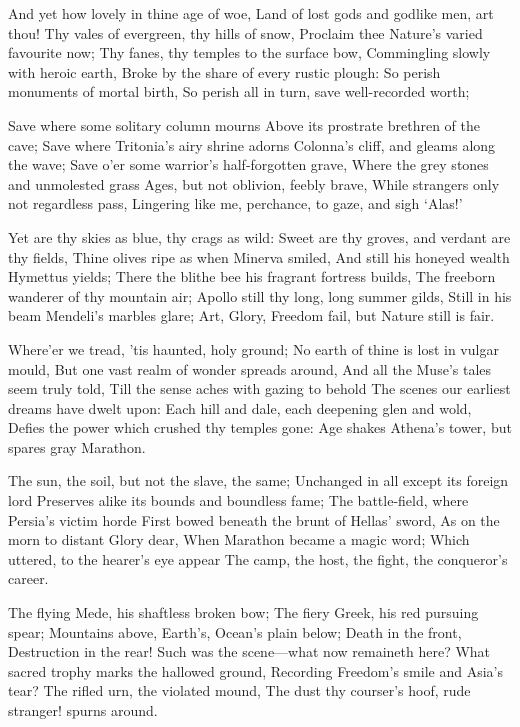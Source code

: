 \documentclass[10pt,twocolumn]{book}
\begin{document}
   And yet how lovely in thine age of woe,
   Land of lost gods and godlike men, art thou!
   Thy vales of evergreen, thy hills of snow,
   Proclaim thee Nature's varied favourite now;
   Thy fanes, thy temples to the surface bow,
   Commingling slowly with heroic earth,
   Broke by the share of every rustic plough:
   So perish monuments of mortal birth,
So perish all in turn, save well-recorded worth;


   Save where some solitary column mourns
   Above its prostrate brethren of the cave;
   Save where Tritonia's airy shrine adorns
   Colonna's cliff, and gleams along the wave;
   Save o'er some warrior's half-forgotten grave,
   Where the grey stones and unmolested grass
   Ages, but not oblivion, feebly brave,
   While strangers only not regardless pass,
Lingering like me, perchance, to gaze, and sigh `Alas!'


   Yet are thy skies as blue, thy crags as wild:
   Sweet are thy groves, and verdant are thy fields,
   Thine olives ripe as when Minerva smiled,
   And still his honeyed wealth Hymettus yields;
   There the blithe bee his fragrant fortress builds,
   The freeborn wanderer of thy mountain air;
   Apollo still thy long, long summer gilds,
   Still in his beam Mendeli's marbles glare;
Art, Glory, Freedom fail, but Nature still is fair.


   Where'er we tread, 'tis haunted, holy ground;
   No earth of thine is lost in vulgar mould,
   But one vast realm of wonder spreads around,
   And all the Muse's tales seem truly told,
   Till the sense aches with gazing to behold
   The scenes our earliest dreams have dwelt upon:
   Each hill and dale, each deepening glen and wold,
   Defies the power which crushed thy temples gone:
Age shakes Athena's tower, but spares gray Marathon.


   The sun, the soil, but not the slave, the same;
   Unchanged in all except its foreign lord\textemdash
   Preserves alike its bounds and boundless fame;
   The battle-field, where Persia's victim horde
   First bowed beneath the brunt of Hellas' sword,
   As on the morn to distant Glory dear,
   When Marathon became a magic word;
   Which uttered, to the hearer's eye appear
The camp, the host, the fight, the conqueror's career.


   The flying Mede, his shaftless broken bow;
   The fiery Greek, his red pursuing spear;
   Mountains above, Earth's, Ocean's plain below;
   Death in the front, Destruction in the rear!
   Such was the scene---what now remaineth here?
   What sacred trophy marks the hallowed ground,
   Recording Freedom's smile and Asia's tear?
   The rifled urn, the violated mound,
The dust thy courser's hoof, rude stranger! spurns around.
\end{document}
